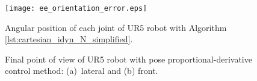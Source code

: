 \begin{figure}
    \centering
    \texttt{[image: ee\_orientation\_error.eps]}	
    \caption{Angular position of each joint of UR5 robot with Algorithm \ref{lst:cartesian_idyn_N_simplified}.}
    \label{fig:act_3.1_ee_orientation_error}
\end{figure}

\begin{figure}
	\centering
	\hfill
	\caption{Final point of view of UR5 robot with pose proportional-derivative control method: (a)~lateral and (b) front.}
	\label{fig:act_3.1_ur5_pov}
\end{figure}